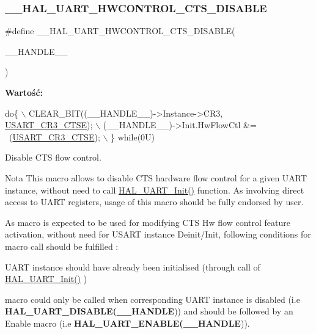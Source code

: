 \subsubsection{\texorpdfstring{\+\_\+\+\_\+\+H\+A\+L\+\_\+\+U\+A\+R\+T\+\_\+\+H\+W\+C\+O\+N\+T\+R\+O\+L\+\_\+\+C\+T\+S\+\_\+\+D\+I\+S\+A\+B\+LE}{\_\_HAL\_UART\_HWCONTROL\_CTS\_DISABLE}}
{\footnotesize\ttfamily \#define \+\_\+\+\_\+\+H\+A\+L\+\_\+\+U\+A\+R\+T\+\_\+\+H\+W\+C\+O\+N\+T\+R\+O\+L\+\_\+\+C\+T\+S\+\_\+\+D\+I\+S\+A\+B\+LE(\begin{DoxyParamCaption}\item[{}]{\+\_\+\+\_\+\+H\+A\+N\+D\+L\+E\+\_\+\+\_\+ }\end{DoxyParamCaption})}

{\bfseries Wartość\+:}
\begin{DoxyCode}
\textcolor{keywordflow}{do}\{                                                       \(\backslash\)
    CLEAR\_BIT((\_\_HANDLE\_\_)->Instance->CR3, \hyperlink{group___peripheral___registers___bits___definition_gaa125f026b1ca2d76eab48b191baed265}{USART\_CR3\_CTSE}); \(\backslash\)
    (\_\_HANDLE\_\_)->Init.HwFlowCtl &= ~(\hyperlink{group___peripheral___registers___bits___definition_gaa125f026b1ca2d76eab48b191baed265}{USART\_CR3\_CTSE});      \(\backslash\)
  \} \textcolor{keywordflow}{while}(0U)
\end{DoxyCode}


Disable C\+TS flow control. 

\begin{DoxyNote}{Nota}
This macro allows to disable C\+TS hardware flow control for a given U\+A\+RT instance, without need to call \hyperlink{group___u_a_r_t___exported___functions___group1_gabe47045024787099b0bfa82bbe7b0b6a}{H\+A\+L\+\_\+\+U\+A\+R\+T\+\_\+\+Init()} function. As involving direct access to U\+A\+RT registers, usage of this macro should be fully endorsed by user. 

As macro is expected to be used for modifying C\+TS Hw flow control feature activation, without need for U\+S\+A\+RT instance Deinit/\+Init, following conditions for macro call should be fulfilled \+:
\begin{DoxyItemize}
\item U\+A\+RT instance should have already been initialised (through call of \hyperlink{group___u_a_r_t___exported___functions___group1_gabe47045024787099b0bfa82bbe7b0b6a}{H\+A\+L\+\_\+\+U\+A\+R\+T\+\_\+\+Init()} )
\item macro could only be called when corresponding U\+A\+RT instance is disabled (i.\+e {\bfseries H\+A\+L\+\_\+\+U\+A\+R\+T\+\_\+\+D\+I\+S\+A\+B\+LE(\+\_\+\+\_\+\+H\+A\+N\+D\+LE})) and should be followed by an Enable macro (i.\+e {\bfseries H\+A\+L\+\_\+\+U\+A\+R\+T\+\_\+\+E\+N\+A\+B\+LE(\+\_\+\+\_\+\+H\+A\+N\+D\+LE})). 
\end{DoxyItemize}
\end{DoxyNote}

